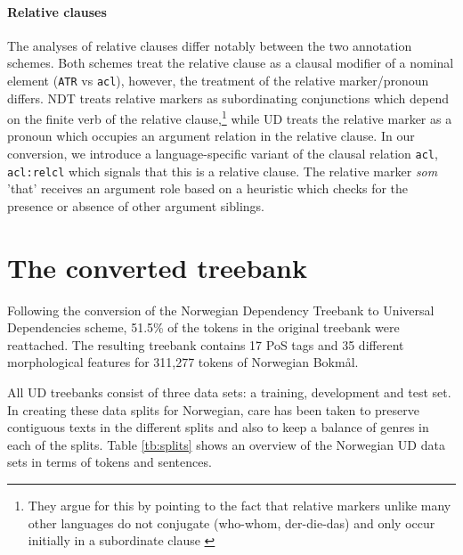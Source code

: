 \documentclass[10pt, a4paper]{article}
\begin{document}
\paragraph{Relative clauses}The analyses of relative clauses differ notably between the two
annotation schemes. Both schemes treat the relative clause as a
clausal modifier of a nominal element ({\tt ATR} vs {\tt acl}),
however, the treatment of the relative marker/pronoun differs. NDT
treats relative markers as subordinating conjunctions which depend on
the finite verb of the relative clause,\footnote{They argue for this
  by pointing to the fact that relative markers unlike many other
  languages do not conjugate (who-whom, der-die-das) and only occur
  initially in a subordinate clause \cite{Faa:Lie:Van:97}} while UD treats
the relative marker as a pronoun which occupies an argument relation
in the relative clause. In our conversion, we introduce a
language-specific variant of the clausal relation {\tt acl}, {\tt
  acl:relcl} which signals that this is a relative clause. The
relative marker {\it som} 'that' receives an argument role based on a
heuristic which checks for the presence or absence of other argument
siblings.


\section{The converted treebank}
Following the conversion of the Norwegian Dependency Treebank to
Universal Dependencies scheme, 51.5\% of the tokens in the original treebank
were reattached. The resulting treebank contains 17 PoS tags and 35 different
morphological features for 311,277 tokens of Norwegian Bokmål.

All UD treebanks consist of three data sets: a training, development
and test set. In creating these data splits for Norwegian, care has
been taken to preserve contiguous texts in the different splits and
also to keep a balance of genres in each of the splits. Table
\ref{tb:splits} shows an overview of the Norwegian UD data sets in
terms of tokens and sentences.
\end{document}
